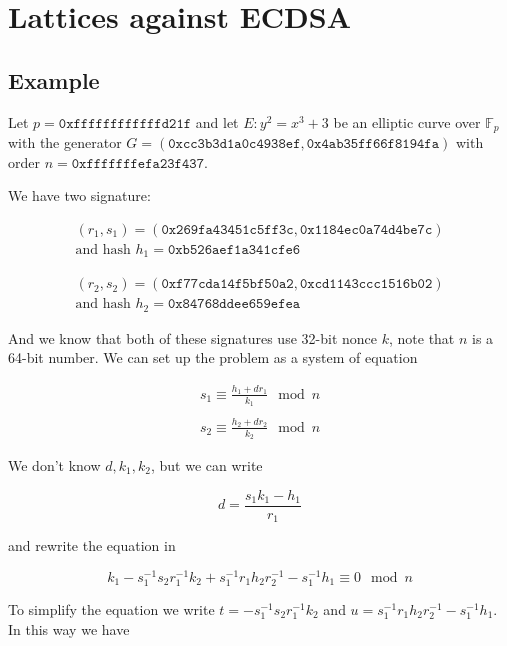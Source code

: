 \documentclass[a4paper,12pt]{report}
\newcommand{\F}{\mathbb{F}}
\begin{document}
\section{Lattices against ECDSA}

\subsection{Example}

Let $p = \texttt{0xffffffffffffd21f}$ and let $E: y^2 = x^3 + 3$ be an elliptic curve over $\F_p$ with the generator
$G = (\texttt{0xcc3b3d1a0c4938ef}, \texttt{0x4ab35ff66f8194fa})$ with order $n = \texttt{0xfffffffefa23f437}$.

\vspace*{10px}

We have two signature:

\[
    \begin{array}{c}
        (r_1, s_1) = (\texttt{0x269fa43451c5ff3c}, \texttt{0x1184ec0a74d4be7c}) \\
        \text{and hash } h_1 = \texttt{0xb526aef1a341cfe6}
    \end{array}
\]

\[
    \begin{array}{c}
        (r_2, s_2) = (\texttt{0xf77cda14f5bf50a2}, \texttt{0xcd1143ccc1516b02}) \\ 
        \text{and hash } h_2 = \texttt{0x84768ddee659efea}
    \end{array}
\]

And we know that both of these signatures use 32-bit nonce $k$, note that $n$ is a 64-bit number. We can set up the problem as a system of equation

\[
    \begin{array}{c}
        s_1 \equiv \displaystyle\frac{h_1 + dr_1}{k_1} \mod n \\ \\ 
        s_2 \equiv \displaystyle\frac{h_2 + dr_2}{k_2} \mod n
    \end{array}
\]

We don't know $d, k_1, k_2$, but we can write 

\[
    d = \displaystyle\frac{s_1k_1 - h_1}{r_1}
\]

and rewrite the equation in

\[
    k_1 - s_1^{-1}s_2r_1^{-1}k_2 + s_1^{-1}r_1h_2r_2^{-1} - s_1^{-1}h_1 \equiv 0 \mod n
\]

To simplify the equation we write $t = - s_1^{-1}s_2r_1^{-1}k_2$ and $u = s_1^{-1}r_1h_2r_2^{-1} - s_1^{-1}h_1$. In this way we have
\end{document}
